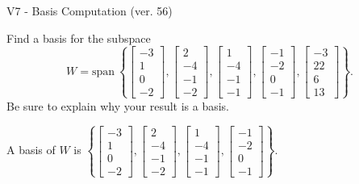 \begin{exercise}
  \begin{exerciseTitle}V7 - Basis Computation (ver. 56)\end{exerciseTitle}
  \begin{exerciseStatement}
    Find a basis for the subspace 
\[W=\mathrm{span}\ \left\{\left[\begin{array}{r}
-3 \\
1 \\
0 \\
-2
\end{array}\right] , \left[\begin{array}{r}
2 \\
-4 \\
-1 \\
-2
\end{array}\right] , \left[\begin{array}{r}
1 \\
-4 \\
-1 \\
-1
\end{array}\right] , \left[\begin{array}{r}
-1 \\
-2 \\
0 \\
-1
\end{array}\right] , \left[\begin{array}{r}
-3 \\
22 \\
6 \\
13
\end{array}\right]\right\}.\]
 Be sure to explain why your result is a basis.


  \end{exerciseStatement}
  \begin{exerciseAnswer}
   A basis of \(W\) is  \(\left\{\left[\begin{array}{r}
-3 \\
1 \\
0 \\
-2
\end{array}\right] , \left[\begin{array}{r}
2 \\
-4 \\
-1 \\
-2
\end{array}\right] , \left[\begin{array}{r}
1 \\
-4 \\
-1 \\
-1
\end{array}\right] , \left[\begin{array}{r}
-1 \\
-2 \\
0 \\
-1
\end{array}\right]\right\}\).
  


  \end{exerciseAnswer}
\end{exercise}